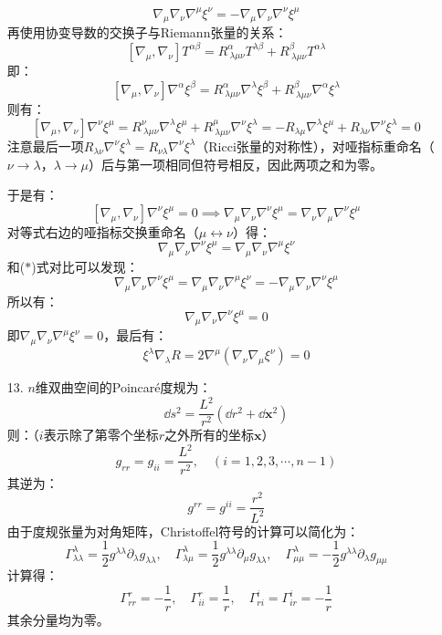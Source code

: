 \documentclass[a4paper]{article}
\begin{document}
\begin{enumerate}
    \begin{equation}
        \nabla_\mu \nabla_\nu \nabla^\mu \xi^\nu = -\nabla_\mu \nabla_\nu \nabla^\nu \xi^\mu
        \tag{$\ast$}
    \end{equation}
    再使用协变导数的交换子与Riemann张量的关系：
    \[
        [\nabla_\mu, \nabla_\nu] T^{\alpha\beta} = R^\alpha_{\ \lambda\mu\nu} T^{\lambda\beta} + R^\beta_{\ \lambda\mu\nu} T^{\alpha\lambda}
    \]
    即：
    \[
        [\nabla_\mu, \nabla_\nu] \nabla^\alpha \xi^\beta = R^\alpha_{\ \lambda\mu\nu} \nabla^\lambda \xi^\beta + R^\beta_{\ \lambda\mu\nu} \nabla^\alpha \xi^\lambda
    \]
    则有：
    \[
        [\nabla_\mu, \nabla_\nu] \nabla^\nu \xi^\mu = R^\nu_{\ \lambda\mu\nu} \nabla^\lambda \xi^\mu + R^\mu_{\ \lambda\mu\nu} \nabla^\nu \xi^\lambda = -R_{\lambda\mu} \nabla^\lambda \xi^\mu + R_{\lambda\nu} \nabla^\nu \xi^\lambda = 0
    \]
    注意最后一项$R_{\lambda\nu} \nabla^\nu \xi^\lambda = R_{\nu\lambda} \nabla^\nu \xi^\lambda$（Ricci张量的对称性），对哑指标重命名（$\nu \to \lambda$，$\lambda \to \mu$）后与第一项相同但符号相反，因此两项之和为零。

    于是有：
    \[
        [\nabla_\mu, \nabla_\nu] \nabla^\nu \xi^\mu = 0 \implies \nabla_\mu \nabla_\nu \nabla^\nu \xi^\mu = \nabla_\nu \nabla_\mu \nabla^\nu \xi^\mu
    \]
    对等式右边的哑指标交换重命名（$\mu \leftrightarrow \nu$）得：
    \[
        \nabla_\mu \nabla_\nu \nabla^\nu \xi^\mu = \nabla_\mu \nabla_\nu \nabla^\mu \xi^\nu
    \]
    和($\ast$)式对比可以发现：
    \[
        \nabla_\mu \nabla_\nu \nabla^\nu \xi^\mu = \nabla_\mu \nabla_\nu \nabla^\mu \xi^\nu = -\nabla_\mu \nabla_\nu \nabla^\nu \xi^\mu
    \]
    所以有：
    \[
        \nabla_\mu \nabla_\nu \nabla^\nu \xi^\mu = 0
    \]
    即$\nabla_\mu \nabla_\nu \nabla^\mu \xi^\nu = 0$，最后有：
    \[
        \xi^\lambda \nabla_\lambda R = 2 \nabla^\mu (\nabla_\nu \nabla_\mu \xi^\nu) = 0
    \]

    \bigskip
    \item[13.]
    $n$维双曲空间的Poincaré度规为：
    \[
        \dd{s}^2 = \frac{L^2}{r^2} (\dd{r}^2 + \dd{\mathbf{x}}^2)
    \]
    则：（$i$表示除了第零个坐标$r$之外所有的坐标$\mathbf{x}$）
    \[
        g_{rr} = g_{ii} = \frac{L^2}{r^2},\quad (i = 1, 2, 3, \cdots, n-1)
    \]
    其逆为：
    \[
        g^{rr} = g^{ii} = \frac{r^2}{L^2}
    \]
    由于度规张量为对角矩阵，Christoffel符号的计算可以简化为：
    \[
        \Gamma^\lambda_{\lambda\lambda} = \frac{1}{2} g^{\lambda\lambda} \partial_\lambda g_{\lambda\lambda},\quad
        \Gamma^\lambda_{\lambda\mu} = \frac{1}{2} g^{\lambda\lambda} \partial_\mu g_{\lambda\lambda},\quad
        \Gamma^\lambda_{\mu\mu} = - \frac{1}{2} g^{\lambda\lambda} \partial_\lambda g_{\mu\mu}
    \]
    计算得：
    \[
        \Gamma^r_{rr} = -\frac{1}{r},\quad \Gamma^r_{ii} = \frac{1}{r},\quad \Gamma^i_{ri} = \Gamma^i_{ir} = -\frac{1}{r}
    \]
    其余分量均为零。


\end{enumerate}
\end{document}
